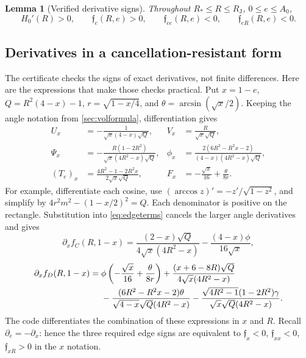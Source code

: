 \documentclass[11pt]{article}
\numberwithin{equation}{section}
\newtheorem{lemma}[theorem]{Lemma}
\theoremstyle{definition}\newtheorem{definition}[theorem]{Definition}
\theoremstyle{remark}\newtheorem{remark}[theorem]{Remark}
\newcommand{\RJ}{R_{\mathrm J}}
\newcommand{\RS}{R_*}
\begin{document}
\begin{lemma}[Verified derivative signs]\label{lem:hullderivs}
Throughout $\RS\le R\le\RJ$, $0\le e\le A_0$,
\begin{equation}\label{eq:derivsigns}
 H_0'(R)>0,\qquad\mathfrak f_e(R,e)>0,\qquad
 \mathfrak f_{ee}(R,e)<0,\qquad\mathfrak f_{eR}(R,e)<0.
\end{equation}
\end{lemma}

\subsection{Derivatives in a cancellation-resistant form}
The certificate checks the signs of exact derivatives, not finite
differences. Here are the expressions that make those checks practical.
Put $x=1-e$, $Q=R^2(4-x)-1$, $r=\sqrt{1-x/4}$, and
$\theta=\arcsin(\sqrt x/2)$. Keeping the angle notation from
\cref{sec:volformula}, differentiation gives
\begin{align}
 U_x&=-\frac1{\sqrt x(4-x)\sqrt Q},&
 V_x&=\frac R{\sqrt x\sqrt Q},\nonumber\\
 \Psi_x&=-\frac{R(1-2R^2)}{\sqrt x(4R^2-x)\sqrt Q},&
 \phi_x&=\frac{2(6R^2-R^2x-2)}{(4-x)(4R^2-x)\sqrt Q},\label{eq:anglederivs}\\
 (T_e)_x&=\frac{4R^2-1-2R^2x}{2\sqrt x\sqrt Q},&
 F_x&=-\frac{\sqrt x}{16}+\frac{\theta}{8r}.\nonumber
\end{align}
For example, differentiate each cosine, use
$(\arccos z)'=-z'/\sqrt{1-z^2}$, and simplify by
$4r^2m^2-(1-x/2)^2=Q$. Each denominator is positive on the rectangle.
Substitution into \cref{eq:edgeterms} cancels the larger angle derivatives
and gives
\begin{equation}\label{eq:outerdx}
 \partial_x f_C(R,1-x)=
 \frac{(2-x)\sqrt Q}{4\sqrt x(4R^2-x)}
 -\frac{(4-x)\phi}{16\sqrt x},
\end{equation}
\begin{align}\label{eq:innerdx}
 \partial_x f_D(R,1-x)={}&
 \phi\left(-\frac{\sqrt x}{16}+\frac{\theta}{8r}\right)
 +\frac{(x+6-8R)\sqrt Q}{4\sqrt x(4R^2-x)}\notag\\
 &-\frac{(6R^2-R^2x-2)\theta}{\sqrt{4-x}\sqrt Q(4R^2-x)}
 -\frac{\sqrt{4R^2-1}(1-2R^2)\gamma}{\sqrt x\sqrt Q(4R^2-x)}.
\end{align}
The code differentiates the combination of these expressions in $x$ and
$R$. Recall $\partial_e=-\partial_x$: hence the three required edge signs
are equivalent to $\mathfrak f_x<0$, $\mathfrak f_{xx}<0$,
$\mathfrak f_{xR}>0$ in the $x$ notation.
\end{document}
